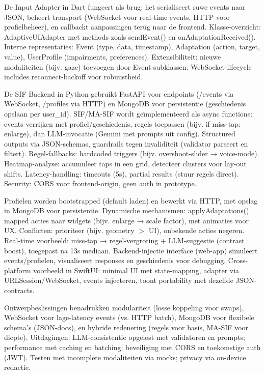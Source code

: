 \documentclass[openany]{book}
\begin{document}
De Input Adapter in Dart fungeert als brug: het serialiseert ruwe events naar JSON, beheert transport (WebSocket voor real-time events, HTTP voor profielbeheer), en callbackt aanpassingen terug naar de frontend. Klasse-overzicht: AdaptiveUIAdapter met methods zoals sendEvent() en onAdaptationReceived(). Interne representaties: Event (type, data, timestamp), Adaptation (action, target, value), UserProfile (impairments, preferences). Extensibiliteit: nieuwe modaliteiten (bijv. gaze) toevoegen door Event-subklassen. WebSocket-lifecycle includes reconnect-backoff voor robuustheid.

De SIF Backend in Python gebruikt FastAPI voor endpoints (/events via WebSocket, /profiles via HTTP) en MongoDB voor persistentie (geschiedenis opslaan per user\_id). SIF/MA-SIF wordt geïmplementeerd als async functions: events verrijken met profiel/geschiedenis, regels toepassen (bijv. if miss-tap: enlarge), dan LLM-invocatie (Gemini met prompts uit config). Structured outputs via JSON-schemas, guardrails tegen invaliditeit (validator parseert en filtert). Regel-fallbacks: hardcoded triggers (bijv. overshoot-slider → voice-mode). Heatmap-analyse: accumuleer taps in een grid, detecteer clusters voor lay-out shifts. Latency-handling: timeouts (5s), partial results (stuur regels direct). Security: CORS voor frontend-origin, geen auth in prototype.

Profielen worden bootstrapped (default laden) en bewerkt via HTTP, met opslag in MongoDB voor persistentie. Dynamische mechanismen: applyAdaptations() mapped acties naar widgets (bijv. enlarge → scale factor), met animaties voor UX. Conflicten: prioriteer (bijv. geometry $>$ UI), onbekende acties negeren. Real-time voorbeeld: miss-tap → regel-vergroting + LLM-suggestie (contrast boost), toegepast na 13s mediaan.
Backend-injectie interface (web-app) simuleert events/profielen, visualiseert responses en geschiedenis voor debugging. Cross-platform voorbeeld in SwiftUI: minimal UI met state-mapping, adapter via URLSession/WebSocket, events injecteren, toont portability met dezelfde JSON-contracts.

Ontwerpbeslissingen benadrukken modulariteit (losse koppeling voor swaps), WebSocket voor lage-latency events (vs. HTTP batch), MongoDB voor flexibele schema's (JSON-docs), en hybride redenering (regels voor basis, MA-SIF voor diepte). Uitdagingen: LLM-consistentie opgelost met validatoren en prompts; performance met caching en batching; beveiliging met CORS en toekomstige auth (JWT). Testen met incomplete modaliteiten via mocks; privacy via on-device redactie.
\end{document}

